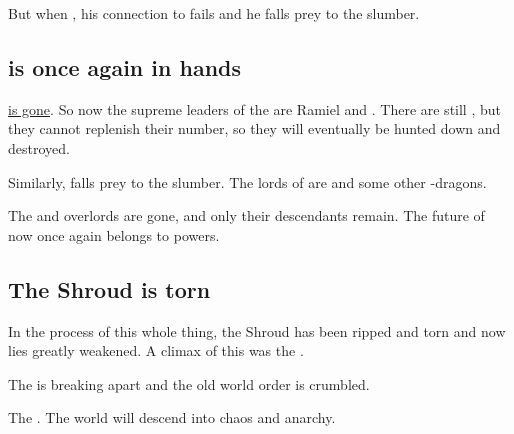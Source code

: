 \begin{garbage}
But when , his connection to \Erebos{} fails and he falls prey to the \xsic{} slumber. 







\subsection{\Miith{} is once again in \Miithian{} hands}
\hyperref[Daggerrain falls]{\Daggerrain{} is gone}. So now the supreme leaders of the \resphain{} are Ramiel and \hs\Azraid. There are still \banelords, but they cannot replenish their number, so they will eventually be hunted down and destroyed. 

Similarly, \Vizsherioch{} falls prey to the \xzaishannic{} slumber. The lords of \dragonkind{} are \Ishnaruchaefir{} and some other \uber-dragons. 

The \Erebean{} and \Machaic{} overlords are gone, and only their descendants remain. The future of \Miith{} now once again belongs to \Miithian{} powers. 









\subsection{The Shroud is torn}
In the process of this whole thing, the Shroud has been ripped and torn and now lies greatly weakened. A climax of this was the . 

The \charade{} is breaking apart and the old world order is crumbled. 

The . 
The world will descend into chaos and anarchy. 

\end{garbage}
